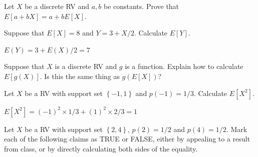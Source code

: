 \documentclass[addpoints,12pt]{exam}
\begin{document}
\begin{questions}
\question Let $X$ be a discrete RV and $a, b$ be constants. 
Prove that $E[a + bX] = a + bE[X]$.

\question Suppose that $E[X]=8$ and $Y= 3 + X/2$. Calculate $E[Y]$.
\begin{solution}
$E(Y) = 3 + E(X)/2 = 7$
\end{solution}

\question Suppose that $X$ is a discrete RV and $g$ is a function. Explain how to calculate $E[g(X)]$. Is this the same thing as $g\left(E[X]\right)$?

\question Let $X$ be a RV with support set $\left\{ -1, 1 \right\}$ and $p(-1) = 1/3$. Calculate $E[X^2]$.
\begin{solution}
  $E[X^2] = (-1)^2 \times 1/3 + (1)^2 \times 2/3 = 1$
\end{solution}

\question Let $X$ be a RV with support set $\left\{ 2,4 \right\}$, $p(2) = 1/2$ and $p(4) = 1/2$. Mark each of the following claims as TRUE or FALSE, either by appealing to a result from class, or by directly calculating both sides of the equality.
\end{questions}
\end{document}
